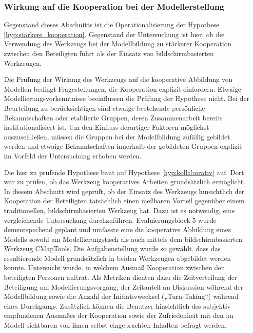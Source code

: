 
\subsubsection{Wirkung auf die Kooperation bei der Modellerstellung} %
\label{ssub:wirkung_auf_die_kooperation_bei_der_modellerstellung}

Gegenstand dieses Abschnitts ist die Operationalisierung der Hypothese \ref{hyp:stärkere_kooperation}. Gegenstand der Untersuchung ist hier, ob die Verwendung des Werkzeugs bei der Modellbildung zu stärkerer Kooperation zwischen den Beteiligten führt als der Einsatz von bildschirmbasierten Werkzeugen.

Die Prüfung der Wirkung des Werkzeugs auf die kooperative Abbildung von Modellen bedingt Fragestellungen, die Kooperation explizit einfordern. Etwaige Modellierungsvorkenntnisse beeinflussen die Prüfung der Hypothese nicht. Bei der Beurteilung zu berücksichtigen sind etwaige bestehende persönliche Bekanntschaften oder etablierte Gruppen, deren Zusammenarbeit bereits institutionalisiert ist. Um den Einfluss derartiger Faktoren möglichst auszuschließen, müssen die Gruppen bei der Modellbildung zufällig gebildet werden und etwaige Bekanntschaften innerhalb der gebildeten Gruppen explizit im Vorfeld der Untersuchung erhoben werden.

Die hier zu prüfende Hypothese baut auf Hypothese \ref{hyp:kollaborativ} auf. Dort war zu prüfen, ob das Werkzeug kooperatives Arbeiten grundsätzlich ermöglicht. In diesem Abschnitt wird geprüft, ob der Einsatz des Werkzeugs hinsichtlich der Kooperation der Beteiligten tatsächlich einen meßbaren Vorteil gegenüber einem traditionellen, bildschirmbasierten Werkzeug hat. Dazu ist es notwendig, eine vergleichende Untersuchung durchzuführen. Evaluierungsblock 5 wurde dementspechend geplant und umfasste eine die kooperative Abbildung eines Modells sowohl am Modellierungstisch als auch mittels dem bildschirmbasierten Werkzeug CMapTools. Die Aufgabenstellung wurde so gewählt, dass das resultierende Modell grundsätzlich in beiden Werkzeugen abgebildet werden konnte. Untersucht wurde, in welchem Ausmaß Kooperation zwischen den beteiligten Personen auftrat. Als Metriken dienten dazu die Zeitverteilung der Beteiligung am Modellierungsvorgang, der Zeitanteil an Diskussion während der Modellbildung sowie die Anzahl der Initiativwechsel („Turn-Taking“) während eines Durchgangs. Zusätzlich können die Benutzer hinsichtlich des subjektiv empfundenen Ausmaßes der Kooperation sowie der Zufriedenheit mit den im Modell sichtbaren von ihnen selbst eingebrachten Inhalten befragt werden.

